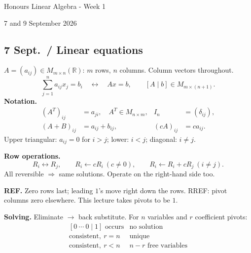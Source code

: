 \documentclass[11pt,letterpaper]{article}
\begin{document}
\begin{center}
{\LARGE Honours Linear Algebra - Week 1\par}
\vspace{5pt}
{\large 7 and 9 September 2026\par}
\end{center}
\vspace{4pt}
\subsection{7 Sept.~/ Linear equations}\label{sept.-linear-equations}

\(A=(a_{ij})\in M_{m\times n}(\mathbb R)\): \(m\) rows, \(n\) columns.
Column vectors throughout. \[
\sum_{j=1}^n a_{ij}x_j=b_i\quad\longleftrightarrow\quad Ax=b,
\qquad[A\mid b]\in M_{m\times(n+1)}.
\] \textbf{Notation.} \[
\begin{aligned}
(A^T)_{ij}&=a_{ji},\quad A^T\in M_{n\times m},& I_n&=(\delta_{ij}),\\
(A+B)_{ij}&=a_{ij}+b_{ij},&(cA)_{ij}&=ca_{ij}.
\end{aligned}
\] Upper triangular: \(a_{ij}=0\) for \(i>j\); lower: \(i<j\); diagonal:
\(i\ne j\).

\textbf{Row operations.} \[
R_i\leftrightarrow R_j,\qquad R_i\leftarrow cR_i\ (c\ne0),\qquad
R_i\leftarrow R_i+cR_j\ (i\ne j).
\] All reversible \(\Rightarrow\) same solutions. Operate on the
right-hand side too.

\textbf{REF.} Zero rows last; leading \(1\)'s move right down the rows.
RREF: pivot columns zero elsewhere. This lecture takes pivots to be
\(1\).

\textbf{Solving.} Eliminate \(\to\) back substitute. For \(n\) variables
and \(r\) coefficient pivots: \[
\begin{array}{c|c}
[0\ \cdots\ 0\mid1]\text{ occurs}&\text{no solution}\\
\text{consistent},\ r=n&\text{unique}\\
\text{consistent},\ r<n&n-r\text{ free variables}
\end{array}
\]
\end{document}
